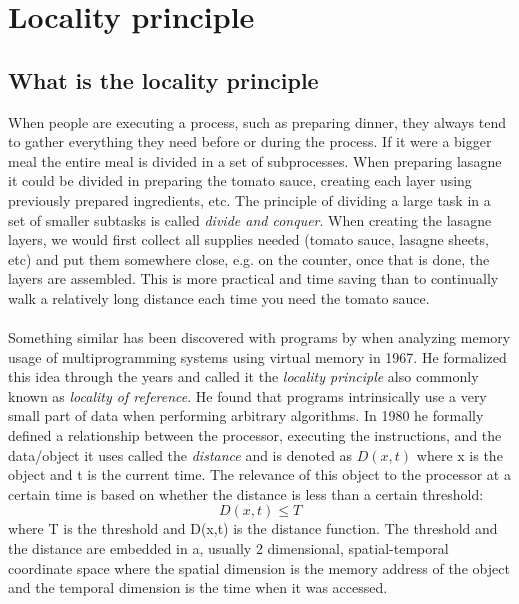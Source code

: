 \documentclass[pdftex,a4paper,12pt,twoside]{report}
\begin{document}
\section{Locality principle}
\subsection{What is the locality principle}
When people are executing a process, such as preparing dinner, they always tend to gather everything they need before or during the process. If it were a bigger meal the entire meal is divided in a set of subprocesses. When preparing lasagne it could be divided in preparing the tomato sauce, creating each layer using previously prepared ingredients, etc. The principle of dividing a large task in a set of smaller subtasks is called \emph{divide and conquer}. %
When creating the lasagne layers, we would first collect all supplies needed (tomato sauce, lasagne sheets, etc) and put them somewhere close, e.g. on the counter, once that is done, the layers are assembled. This is more practical and time saving than to continually walk a relatively long distance each time you need the tomato sauce.
\\\\
Something similar has been discovered with programs by \cite{locality_principle} when analyzing memory usage of multiprogramming systems using virtual memory in 1967.
He formalized this idea through the years and called it the \emph{locality principle} also commonly known as \emph{locality of reference}. He found that programs intrinsically use a very small part of data when performing arbitrary algorithms. In 1980 he formally defined a relationship between the processor, executing the instructions, and the data/object it uses called the \emph{distance} and is denoted as $D(x,t)$ where x is the object and t is the current time. The relevance of this object to the processor at a certain time is based on whether the distance is less than a certain threshold:
\[
	D(x,t) \leq T
\]
where T is the threshold and D(x,t) is the distance function. The threshold and the distance are embedded in a, usually 2 dimensional, spatial-temporal coordinate space where the spatial dimension is the memory address of the object and the temporal dimension is the time when it was accessed.
\end{document}
